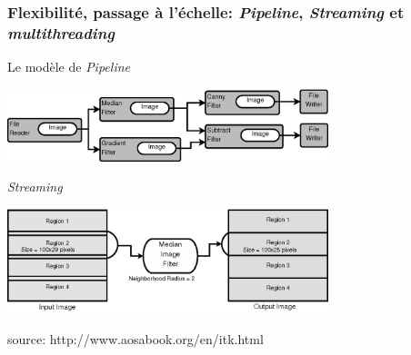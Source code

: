 \documentclass[8pt]{beamer}
\begin{document}
\begin{frame}
\frametitle{Flexibilité, passage à l'échelle: \textit{Pipeline}, \textit{Streaming} et \textit{multithreading}}

\begin{block}{Le modèle de \textit{Pipeline}}
\begin{center}
\includegraphics[width=0.7\textwidth]{images/ProcessObjectDataObject.png}
\end{center}
\end{block}
\vspace{-0.5cm}
\begin{block}{\textit{Streaming}}
\begin{center}
\includegraphics[width=0.7\textwidth]{images/StreamingImageDiagram.png}
\end{center}
\end{block}
\vspace{-0.5cm}
\begin{center}
\tiny{source: http://www.aosabook.org/en/itk.html}
\end{center}
\end{frame}
\end{document}
